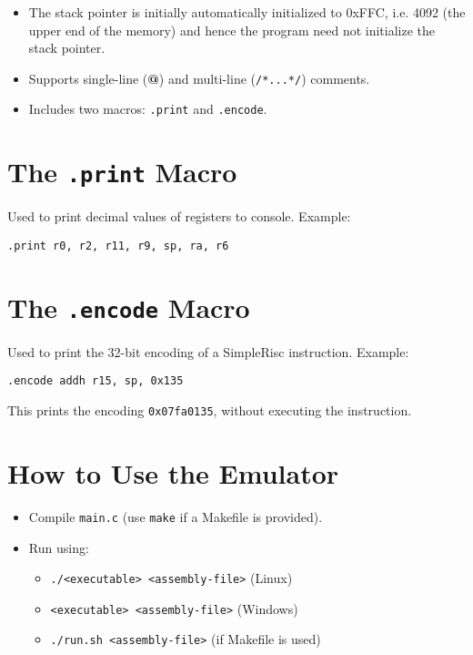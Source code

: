 \documentclass[12pt]{article}
\begin{document}
\begin{itemize}[leftmargin=*]
  \item The stack pointer is initially automatically initialized to 0xFFC, i.e. 4092 (the upper end
of the memory) and hence the program need not initialize the stack pointer.

  \item Supports single-line (\textbf{@}) and multi-line (\texttt{/*...*/}) comments.
  
  \item Includes two macros: \texttt{.print} and \texttt{.encode}.
\end{itemize}

\section*{The \texttt{.print} Macro}

Used to print decimal values of registers to console.  
Example:
\begin{lstlisting}[language={},basicstyle=\ttfamily]
.print r0, r2, r11, r9, sp, ra, r6
\end{lstlisting}

\section*{The \texttt{.encode} Macro}
Used to print the 32-bit encoding of a SimpleRisc instruction.  
Example:
\begin{lstlisting}[language={},basicstyle=\ttfamily]
.encode addh r15, sp, 0x135
\end{lstlisting}
This prints the encoding \texttt{0x07fa0135}, without executing the instruction.

\section*{How to Use the Emulator}
\begin{itemize}[leftmargin=*]
  \item Compile \texttt{main.c} (use \texttt{make} if a Makefile is provided).
  \item Run using:
  \begin{itemize}
    \item \texttt{./<executable> <assembly-file>} (Linux)
    \item \texttt{<executable> <assembly-file>} (Windows)
    \item \texttt{./run.sh <assembly-file>} (if Makefile is used)
  \end{itemize}
\end{itemize}
\end{document}
